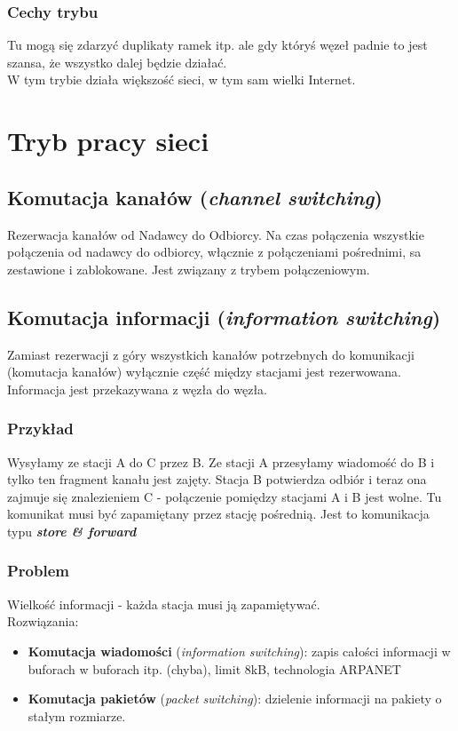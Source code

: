 			\subsubsection{Cechy trybu}
				Tu mogą się zdarzyć duplikaty ramek itp. ale gdy któryś węzeł padnie to jest szansa, że wszystko dalej będzie działać.\\
				W tym trybie działa większość sieci, w tym sam wielki Internet.
	\section{Tryb pracy sieci}
		\subsection{Komutacja kanałów (\emph{channel switching})}
			Rezerwacja kanałów od Nadawcy do Odbiorcy. Na czas połączenia wszystkie połączenia od nadawcy do odbiorcy, włącznie z połączeniami pośrednimi, sa zestawione i zablokowane. Jest związany z trybem połączeniowym.
		\subsection{Komutacja informacji (\emph{information switching})}
			Zamiast rezerwacji z góry wszystkich kanałów potrzebnych do komunikacji (komutacja kanałów) wyłącznie część między stacjami jest rezerwowana. Informacja jest przekazywana z węzła do węzła.
			\subsubsection{Przykład}
				Wysyłamy ze stacji A do C przez B. Ze stacji A przesyłamy wiadomość do B i tylko ten fragment kanału jest zajęty. Stacja B potwierdza odbiór i teraz ona zajmuje się znalezieniem C - połączenie pomiędzy stacjami A i B jest wolne. Tu komunikat musi być zapamiętany przez stację pośrednią. Jest to komunikacja typu \textbf{\emph{store \& forward}}
			\subsubsection{Problem}
				Wielkość informacji - każda stacja musi ją zapamiętywać.\\
				Rozwiązania:
				\begin{itemize}
					\item \textbf{Komutacja wiadomości} (\emph{information switching}): zapis całości informacji w buforach w buforach itp. (chyba), limit 8kB, technologia ARPANET
					\item \textbf{Komutacja pakietów} (\emph{packet switching}): dzielenie informacji na pakiety o stałym rozmiarze.
				\end{itemize}
